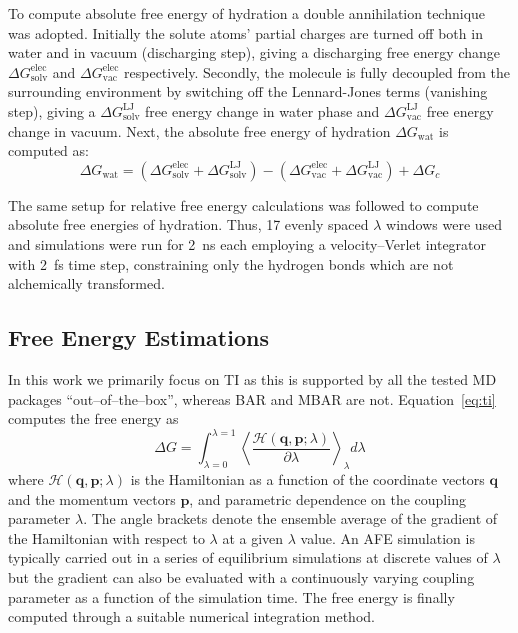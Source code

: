 \documentclass[journal=jctcce,manuscript=article]{achemso}
\renewcommand{\vec}[1]{\mathbf{#1}}
\begin{document}
To compute absolute free energy of hydration a double annihilation
technique~\cite{jorgensen1988efficient,GILSON19971047,Bosisio2016}
was adopted.
Initially the solute atoms' partial charges are turned off both in water and in
vacuum (discharging step), giving a discharging
free energy change $\Delta G_\mathrm{solv}^\mathrm{elec}$ and $\Delta
G_\mathrm{vac}^\mathrm{elec}$ respectively. Secondly,
the molecule is fully decoupled from the surrounding environment by switching
off the Lennard-Jones terms (vanishing step), giving a $\Delta
G_\mathrm{solv}^\mathrm{LJ}$ free energy change in water phase and $\Delta
G_\mathrm{vac}^\mathrm{LJ}$ free energy change in vacuum.
Next, the absolute free energy of hydration $\Delta G_\mathrm{wat}$ is computed as:
\begin{equation}
\label{eq:absolutehyd}
\Delta G_\mathrm{wat} = (\Delta G_\mathrm{solv}^\mathrm{elec} + \Delta
G_\mathrm{solv}^\mathrm{LJ}) - (\Delta G_\mathrm{vac}^\mathrm{elec} + \Delta
G_\mathrm{vac}^\mathrm{LJ}) + \Delta G_c
\end{equation}

The same setup for relative free energy calculations was followed to
compute absolute free energies of hydration.  Thus, 17 evenly spaced $\lambda$ windows were used and simulations were run for \SI{2}{ns} each employing a velocity--Verlet integrator with \SI{2}{fs} time step, constraining only the hydrogen bonds which are not alchemically transformed.


\subsection{Free Energy Estimations}
\label{sec:analysis}

In this work we primarily focus on TI as this is supported by all the tested MD packages ``out--of--the--box'', whereas BAR and MBAR are not.
Equation~\ref{eq:ti} computes the free energy as
\begin{equation}\label{eq:ti}
	\Delta G = \int_{\lambda=0}^{\lambda=1}
	\left\langle
	\frac{\mathscr{H}(\vec{q},\vec{p};\lambda)}{\partial\lambda}\right\rangle_\lambda
	 d\lambda
\end{equation}
where $\mathscr{H}(\vec{q},\vec{p};\lambda)$ is the Hamiltonian as a function
of the coordinate vectors $\vec{q}$ and the momentum vectors $\vec{p}$, and
parametric dependence on the coupling parameter $\lambda$.  The angle brackets
denote the ensemble average of the gradient of the Hamiltonian with respect to
$\lambda$ at a given $\lambda$ value.  An AFE simulation is typically carried
out in a series of equilibrium simulations at discrete values of $\lambda$ but
the gradient can also be evaluated with a continuously varying coupling
parameter as a function of the simulation time.  The free energy is finally
computed through a suitable numerical integration method.
\end{document}
